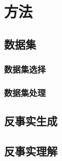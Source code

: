\section{方法}
\subsection{数据集}
\subsubsection{数据集选择}
\subsubsection{数据集处理}


\subsection{反事实生成}


\subsection{反事实理解}

